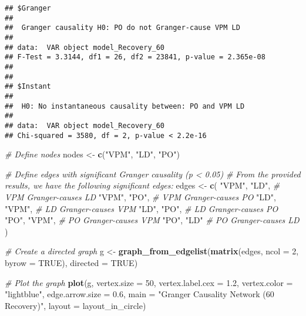 \documentclass[
]{article}
\newenvironment{Shaded}{\begin{snugshade}}{\end{snugshade}}
\newcommand{\AttributeTok}[1]{\textcolor[rgb]{0.13,0.29,0.53}{#1}}
\newcommand{\CommentTok}[1]{\textcolor[rgb]{0.56,0.35,0.01}{\textit{#1}}}
\newcommand{\ConstantTok}[1]{\textcolor[rgb]{0.56,0.35,0.01}{#1}}
\newcommand{\DecValTok}[1]{\textcolor[rgb]{0.00,0.00,0.81}{#1}}
\newcommand{\FloatTok}[1]{\textcolor[rgb]{0.00,0.00,0.81}{#1}}
\newcommand{\FunctionTok}[1]{\textcolor[rgb]{0.13,0.29,0.53}{\textbf{#1}}}
\newcommand{\NormalTok}[1]{#1}
\newcommand{\OtherTok}[1]{\textcolor[rgb]{0.56,0.35,0.01}{#1}}
\newcommand{\StringTok}[1]{\textcolor[rgb]{0.31,0.60,0.02}{#1}}
\begin{document}
\begin{verbatim}
## $Granger
## 
##  Granger causality H0: PO do not Granger-cause VPM LD
## 
## data:  VAR object model_Recovery_60
## F-Test = 3.3144, df1 = 26, df2 = 23841, p-value = 2.365e-08
## 
## 
## $Instant
## 
##  H0: No instantaneous causality between: PO and VPM LD
## 
## data:  VAR object model_Recovery_60
## Chi-squared = 3580, df = 2, p-value < 2.2e-16
\end{verbatim}

\begin{Shaded}
\begin{Highlighting}[]
\CommentTok{\# Define nodes}
\NormalTok{nodes }\OtherTok{\textless{}{-}} \FunctionTok{c}\NormalTok{(}\StringTok{"VPM"}\NormalTok{, }\StringTok{"LD"}\NormalTok{, }\StringTok{"PO"}\NormalTok{)}

\CommentTok{\# Define edges with significant Granger causality (p \textless{} 0.05)}
\CommentTok{\# From the provided results, we have the following significant edges:}
\NormalTok{edges }\OtherTok{\textless{}{-}} \FunctionTok{c}\NormalTok{(}
  \StringTok{"VPM"}\NormalTok{, }\StringTok{"LD"}\NormalTok{,  }\CommentTok{\# VPM Granger{-}causes LD}
  \StringTok{"VPM"}\NormalTok{, }\StringTok{"PO"}\NormalTok{,  }\CommentTok{\# VPM Granger{-}causes PO}
  \StringTok{"LD"}\NormalTok{, }\StringTok{"VPM"}\NormalTok{,  }\CommentTok{\# LD Granger{-}causes VPM}
  \StringTok{"LD"}\NormalTok{, }\StringTok{"PO"}\NormalTok{,   }\CommentTok{\# LD Granger{-}causes PO}
  \StringTok{"PO"}\NormalTok{, }\StringTok{"VPM"}\NormalTok{,  }\CommentTok{\# PO Granger{-}causes VPM}
  \StringTok{"PO"}\NormalTok{, }\StringTok{"LD"}    \CommentTok{\# PO Granger{-}causes LD}
\NormalTok{)}

\CommentTok{\# Create a directed graph}
\NormalTok{g }\OtherTok{\textless{}{-}} \FunctionTok{graph\_from\_edgelist}\NormalTok{(}\FunctionTok{matrix}\NormalTok{(edges, }\AttributeTok{ncol =} \DecValTok{2}\NormalTok{, }\AttributeTok{byrow =} \ConstantTok{TRUE}\NormalTok{), }\AttributeTok{directed =} \ConstantTok{TRUE}\NormalTok{)}

\CommentTok{\# Plot the graph}
\FunctionTok{plot}\NormalTok{(g,}
     \AttributeTok{vertex.size =} \DecValTok{50}\NormalTok{,}
     \AttributeTok{vertex.label.cex =} \FloatTok{1.2}\NormalTok{,}
     \AttributeTok{vertex.color =} \StringTok{"lightblue"}\NormalTok{,}
     \AttributeTok{edge.arrow.size =} \FloatTok{0.6}\NormalTok{,}
     \AttributeTok{main =} \StringTok{"Granger Causality Network (60 Recovery)"}\NormalTok{,}
     \AttributeTok{layout =}\NormalTok{ layout\_in\_circle)}
\end{Highlighting}
\end{Shaded}
\end{document}
